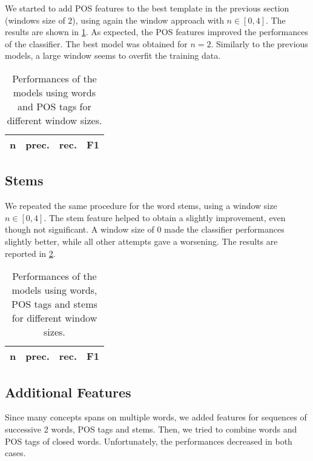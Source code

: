 We started to add \ac{POS} features to the best template in the previous section (windows size of $2$), using again the window approach with $n \in [0,4]$.
The results are shown in \cref{tab:pos}.
As expected, the \ac{POS} features improved the performances of the classifier.
The best model was obtained for $n = 2$.
Similarly to the previous models, a large window seems to overfit the training data.

\begin{table}[h]
	\centering
    \begin{tabular}{ c c c c }
    	\toprule
    		\multicolumn{1}{c}{n} & \multicolumn{1}{c}{prec.} & \multicolumn{1}{c}{rec.} & \multicolumn{1}{c}{F1} \\
    	\midrule
            
    	\bottomrule
	\end{tabular}
    \caption{Performances of the models using words and POS tags for different window sizes.}
	\label{tab:pos}
\end{table}

\subsection{Stems}
\label{subsection:stems}
We repeated the same procedure for the word stems, using a window size $n \in [0,4]$.
The stem feature helped to obtain a slightly improvement, even though not significant.
A window size of $0$ made the classifier performances slightly better, while all other attempts gave a worsening.
The results are reported in \cref{tab:stems}.

\begin{table}[h]
	\centering
    \begin{tabular}{ c c c c }
    	\toprule
    		\multicolumn{1}{c}{n} & \multicolumn{1}{c}{prec.} & \multicolumn{1}{c}{rec.} & \multicolumn{1}{c}{F1} \\
    	\midrule
            
    	\bottomrule
	\end{tabular}
    \caption{Performances of the models using words, POS tags and stems for different window sizes.}
	\label{tab:stems}
\end{table}

\subsection{Additional Features}
\label{subsection:additional}
Since many concepts spans on multiple words, we added features for sequences of successive 2 words, \ac{POS} tags and stems.
Then, we tried to combine words and \ac{POS} tags of closed words.
Unfortunately, the performances decreased in both cases.

